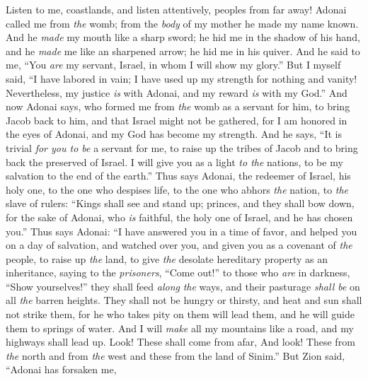 \begin{biblechapter} %
 Listen to me, coastlands, 
and listen attentively, peoples from far away! 
Adonai called me from \textit{the} womb; 
from the \textit{body} of my mother he made my name known.
\verse And he \textit{made} my mouth like a sharp sword; 
he hid me in the shadow of his hand, 
and he \textit{made} me like an sharpened arrow; 
he hid me in his quiver.
\verse And he said to me, “You \textit{are} my servant, 
Israel, in whom I will show my glory.”
\verse But I myself said, “I have labored in vain; 
I have used up my strength for nothing and vanity! 
Nevertheless, my justice \textit{is} with Adonai, 
and my reward \textit{is} with my God.”
\verse And now Adonai says, 
who formed me from \textit{the} womb as a servant for him, 
to bring Jacob back to him, 
and that Israel might not be gathered, 
for I am honored in the eyes of Adonai, 
and my God has become my strength.
\verse And he says, “It is trivial \textit{for you to be} a servant for me, to raise up the tribes of Jacob 
and to bring back the preserved of Israel. 
I will give you as a light \textit{to the} nations, 
to be my salvation to the end of the earth.”
\verse Thus says Adonai, the redeemer of Israel, his holy one, to the one who despises life, 
to the one who abhors \textit{the} nation, 
to \textit{the} slave of rulers: 
“Kings shall see and stand up; 
princes, and they shall bow down, 
for the sake of Adonai, who \textit{is} faithful, 
the holy one of Israel, and he has chosen you.”
 Thus says Adonai:
\verse “I have answered you in a time of favor, 
and helped you on a day of salvation, 
and watched over you, 
and given you as a covenant of \textit{the} people, 
to raise up \textit{the} land, 
to give \textit{the} desolate hereditary property as an inheritance,
\verse saying to the \textit{prisoners}, “Come out!” 
to those who \textit{are} in darkness, “Show yourselves!” 
they shall feed \textit{along} \textit{the} ways, 
and their pasturage \textit{shall be} on all \textit{the} barren heights.
\verse They shall not be hungry or thirsty, 
and heat and sun shall not strike them, 
for he who takes pity on them will lead them, 
and he will guide them to springs of water.
\verse And I will \textit{make} all my mountains like a road, 
and my highways shall lead up.
\verse Look! These shall come from afar, 
And look! These from \textit{the} north and from \textit{the} west 
and these from the land of Sinim.”
 But Zion said, “Adonai has forsaken me, 

\end{biblechapter}
